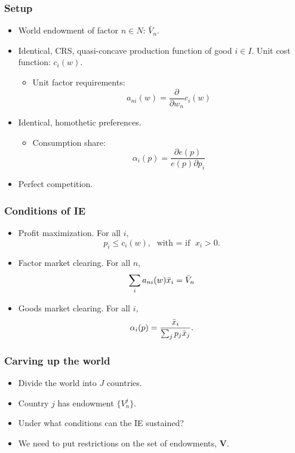 \documentclass[compress,mathserif,aspectratio=169]{beamer}
\begin{document}
\begin{frame}\frametitle{Setup}\hypertarget{Setup}{}
\begin{itemize}
\item World endowment of factor $n\in N$: $\bar V_n$.

\item Identical, CRS, quasi-concave production function of good $i\in I$. Unit cost function: $c_i(w)$.
\begin{itemize}
\item Unit factor requirements:
    \[a_{ni}(w)=\frac{\partial}{\partial w_n}c_i(w)\]
\end{itemize}

\item Identical, homothetic  preferences.
\begin{itemize}
\item Consumption share:
    \[\alpha_i(p) = \frac{\partial e(p)}{e(p) \partial p_i}\]
\end{itemize}

\item Perfect competition.


\end{itemize}
\end{frame}



\begin{frame}\frametitle{Conditions of IE}\hypertarget{Conditions of IE}{}
\begin{itemize}
\item Profit maximization. For all $i$,
\[
p_i \le c_i(w), \text{ with $=$ if }x_i>0.
\]

\item Factor market clearing. For all $n$,
\[
\sum_i a_{ni}(w)\Bar x_i = \Bar V_n
\]

\item Goods market clearing. For all $i$,
\[
\alpha_i(p) = \frac{\Bar x_i}{\sum_j p_j\Bar x_j}.
\]


\end{itemize}
\end{frame}



\begin{frame}\frametitle{Carving up the world}\hypertarget{Carving up the world}{}
\begin{itemize}
\item Divide the world into $J$ countries.

\item Country $j$ has endowment $\{V^j_n\}$.

\item Under what conditions can the IE sustained?

\item We need to put restrictions on the set of endowments, $\mathbf V$.


\end{itemize}
\end{frame}
\end{document}
